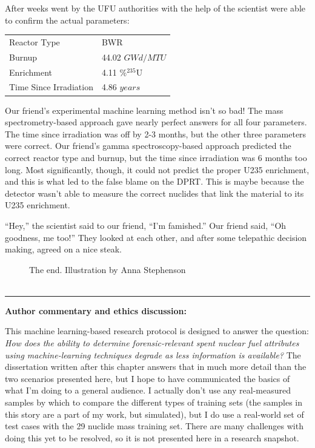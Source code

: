 {After weeks went by the UFU authorities with the help of the scientist were
able to confirm the actual parameters:
\begin{table}[H]
  \centering
  \begin{tabular}{ll} \toprule
    Reactor Type           & BWR                          \\
    Burnup                 & 44.02 $\scriptstyle GWd/MTU$ \\
    Enrichment             & 4.11 \%${}^{235}\text{U}$    \\
    Time Since Irradiation & 4.86 $years$                 \\ \bottomrule
  \end{tabular}
\end{table}
Our friend's experimental machine learning method isn't so bad! The mass
spectrometry-based approach gave nearly perfect answers for all four
parameters. The time since irradiation was off by 2-3 months, but the other
three parameters were correct. Our friend's gamma spectroscopy-based approach
predicted the correct reactor type and burnup, but the time since irradiation
was 6 months too long. Most significantly, though, it could not predict the
proper \gls{U235} enrichment, and this is what led to the false blame on the
DPRT.  This is maybe because the detector wasn't able to measure the correct
nuclides that link the material to its \gls{U235} enrichment. 

\begin{shadequote}

  ``Hey,'' the scientist said to our friend, ``I'm famished.'' Our friend said, ``Oh
  goodness, me too!'' They looked at each other, and after some telepathic
  decision making, agreed on a nice steak.

\end{shadequote}

\begin{figure}[H]
  \centering
  \large The end. \small Illustration by Anna Stephenson \\~\\
\end{figure}

\hrule

\textbf{Author commentary and ethics discussion:}

This machine learning-based research protocol is designed to answer the
question: \textit{How does the ability to determine forensic-relevant spent
nuclear fuel attributes using machine-learning techniques degrade as less
information is available?} The dissertation written after this chapter answers
that in much more detail than the two scenarios presented here, but I hope to
have communicated the basics of what I'm doing to a general audience. I
actually don't use any real-measured samples by which to compare the different
types of training sets (the samples in this story are a part of my work, but
simulated), but I do use a real-world set of test cases with the 29 nuclide
mass training set.  There are many challenges with doing this yet to be
resolved, so it is not presented here in a research snapshot.

}
